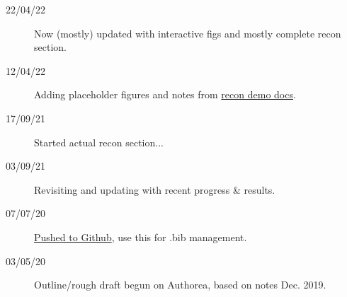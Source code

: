 \begin{description}
\item [{22/04/22}] Now (mostly) updated with interactive figs and mostly complete recon section.
\item [{12/04/22}] Adding placeholder figures and notes from \href{https://pemtk.readthedocs.io/en/latest/fitting/PEMtk_analysis_demo_150621-tidy.html}{recon demo docs}.
\item [{17/09/21}] Started actual recon section...
\item [{03/09/21}] Revisiting and updating with recent progress \& results.
\item [{07/07/20}] \href{https://github.com/phockett/Extracting-Molecular-Frame-Photoionization-Dynamics-from-Experimental-Data}{Pushed to Github}, use this for .bib management.
\item [{03/05/20}] Outline/rough draft begun on Authorea, based on notes Dec. 2019.
\end{description}